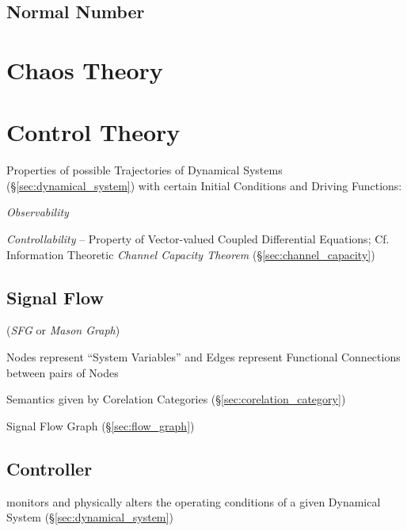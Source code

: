 \subsection{Normal Number}\label{sec:normal_number}



\section{Chaos Theory}\label{sec:chaos_theory}

\section{Control Theory}\label{sec:control_theory}

Properties of possible Trajectories of Dynamical Systems
(\S\ref{sec:dynamical_system}) with certain Initial Conditions and
Driving Functions:

\emph{Observability}

\emph{Controllability} -- Property of Vector-valued Coupled
Differential Equations; \fist Cf. Information Theoretic \emph{Channel
  Capacity Theorem} (\S\ref{sec:channel_capacity})



\subsection{Signal Flow}\label{sec:signal_flow}

(\emph{SFG} or \emph{Mason Graph})

Nodes represent ``System Variables'' and Edges represent Functional
Connections between pairs of Nodes


Semantics given by Corelation Categories
(\S\ref{sec:corelation_category})

Signal Flow Graph (\S\ref{sec:flow_graph})



\subsection{Controller}\label{sec:controller}


monitors and physically alters the operating conditions of a given
Dynamical System (\S\ref{sec:dynamical_system})
